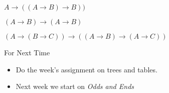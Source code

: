 \documentclass[
  ignorenonframetext,
]{beamer}
\providecommand{\tightlist}{%
  \setlength{\itemsep}{0pt}\setlength{\parskip}{0pt}}
\renewcommand{\,}{\text{, }}
\begin{document}
\begin{frame}{\(A \rightarrow ((A \rightarrow B) \rightarrow B))\)}
\protect\hypertarget{a-rightarrow-a-rightarrow-b-rightarrow-b}{}

\end{frame}

\begin{frame}{\((A \rightarrow B) \rightarrow (A \rightarrow B)\)}
\protect\hypertarget{a-rightarrow-b-rightarrow-a-rightarrow-b}{}

\end{frame}

\begin{frame}{\((A \rightarrow (B \rightarrow C)) \rightarrow ((A \rightarrow B) \rightarrow (A \rightarrow C))\)}
\protect\hypertarget{a-rightarrow-b-rightarrow-c-rightarrow-a-rightarrow-b-rightarrow-a-rightarrow-c}{}

\end{frame}

\begin{frame}{For Next Time}
\protect\hypertarget{for-next-time}{}

\begin{itemize}
\tightlist
\item
  Do the week's assignment on trees and tables.
\item
  Next week we start on \emph{Odds and Ends}
\end{itemize}

\end{frame}
\end{document}

